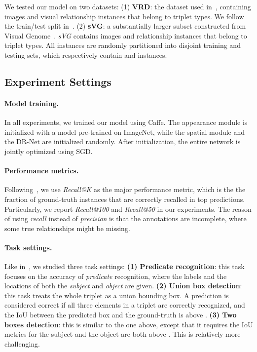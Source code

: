  
We tested our model on two datasets:
(1) \textbf{VRD}: the dataset used in~\cite{lu2016visual},
containing  images and
 visual relationship instances that belong to
 triplet types.
We follow the train/test split in~\cite{lu2016visual}.
(2) \textbf{sVG}: a substantially larger subset
constructed from Visual Genome~\cite{krishnavisualgenome}.
\emph{sVG} contains  images and  relationship instances
that belong to  triplet types.
All instances are randomly partitioned into disjoint training and testing sets,
which respectively contain  and  instances.

\subsection{Experiment Settings}

\paragraph{Model training.}
In all experiments, we trained our model using Caffe\cite{jia2014caffe}.
The appearance module is initialized with a model pre-trained on ImageNet,
while the spatial module and the DR-Net are initialized randomly.
After initialization, the entire network is jointly optimized using SGD.

\paragraph{Performance metrics.}
Following~\cite{lu2016visual}, we use \emph{Recall@K} as the major performance metric,
which is the the fraction of ground-truth instances that are correctly recalled in top  predictions.
Particularly, we report \emph{Recall@100} and \emph{Recall@50} in our experiments.
The reason of using \emph{recall} instead of \emph{precision} is that
the annotations are incomplete, where some true relationships might be missing.

\paragraph{Task settings.}
Like in~\cite{lu2016visual}, we studied three task settings:
\textbf{(1) Predicate recognition}: this task focuses on the accuracy of \emph{predicate} recognition,
where the labels and the locations of both the \emph{subject} and \emph{object} are given.
\textbf{(2) Union box detection}: this task treats the whole triplet as a union bounding box.
A prediction is considered correct if all three elements in a triplet  are
correctly recognized, and the IoU between the predicted box and the ground-truth is
above .
\textbf{(3) Two boxes detection}: this is similar to the one above,
except that it requires the IoU metrics for the subject and the object
are both above . This is relatively more challenging.


